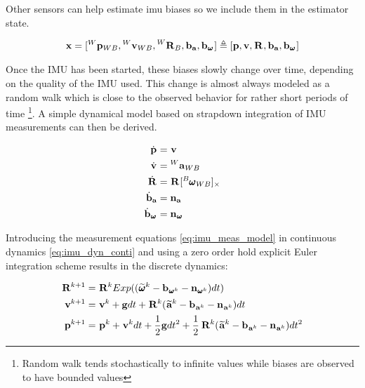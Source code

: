 Other sensors can help estimate imu biases so we include them in the estimator state.

\begin{equation}
    {\bf x} = [\prescript{W}{}{{\bf p}}_{WB}, \prescript{W}{}{{\bf v}}_{WB}, \prescript{W}{}{{\bf R}}_{B}, {\bf b}_{{\bf a}}, {\bf b}_{\prescript{}{}{\pmb{\omega}}_{}}]
    \triangleq 
    [{\bf p}, {\bf v}, \prescript{}{}{{\bf R}}_{}, {\bf b}_{{\bf a}}, {\bf b}_{\prescript{}{}{\pmb{\omega}}_{}}] 
\end{equation}

Once the IMU has been started, these biases slowly change over time, depending on the quality of the IMU used. This change is almost always modeled 
as a random walk which is close to the observed behavior for rather short periods of time \footnote{Random walk tends stochastically to infinite values
while biases are observed to have bounded values}. A simple dynamical model based on strapdown integration of IMU measurements can then be derived.

\begin{equation}
    \begin{split}
    \dot{\prescript{}{}{{\bf p}}_{}} &= \prescript{}{}{{\bf v}}_{}  \\
    \dot{\prescript{}{}{{\bf v}}_{}} &= \prescript{W}{}{{\bf a}}_{WB} \\
    \dot{\prescript{}{}{{\bf R}}_{}} &= \prescript{}{}{{\bf R}}_{} [\prescript{B}{}{\pmb{\omega}}_{WB}]_{\times} \\
    \dot{{\bf b}}_{{\bf a}} &= {\bf n}_{{\bf a}}  \\
    \dot{{\bf b}}_{\prescript{}{}{\pmb{\omega}}_{}} &= {\bf n}_{\prescript{}{}{\pmb{\omega}}_{}} \\
    \end{split}
    \label{eq:imu_dyn_conti}
\end{equation}

Introducing the measurement equations \ref{eq:imu_meas_model} in continuous dynamics \ref{eq:imu_dyn_conti} and using a zero order hold
explicit Euler integration scheme results in the discrete dynamics:

\begin{equation}
    \begin{split}
    \prescript{}{}{{\bf R}}_{}^{k+1}  &= \prescript{}{}{{\bf R}}_{}^{k}Exp((\prescript{}{}{\widetilde{\pmb{\omega}}}_{}^k - {\bf b}_{\prescript{}{}{\pmb{\omega}}_{}^k} - {\bf n}_{\prescript{}{}{\pmb{\omega}}_{}^k})dt)
    \\
    \prescript{}{}{{\bf v}}_{}^{k+1}  &= \prescript{}{}{{\bf v}}_{}^{k} + {\bf g} dt + \prescript{}{}{{\bf R}}_{}^{k}(\prescript{}{}{\widetilde{{\bf a}}}_{}^k - {\bf b}_{\prescript{}{}{{\bf a}}_{}^k} - {\bf n}_{\prescript{}{}{{\bf a}}_{}^k})dt
    \\
    \prescript{}{}{{\bf p}}_{}^{k+1} &= \prescript{}{}{{\bf p}}_{}^{k} + \prescript{}{}{{\bf v}}_{}^{k}dt + \frac{1}{2}{\bf g} dt^2 
    + \frac{1}{2}\prescript{}{}{{\bf R}}_{}^{k}(\prescript{}{}{\widetilde{{\bf a}}}_{}^k - {\bf b}_{\prescript{}{}{{\bf a}}_{}^k} - {\bf n}_{\prescript{}{}{{\bf a}}_{}^k})dt^2
    \end{split}
    \label{eq:imu_dyn_disc}
\end{equation}
    
